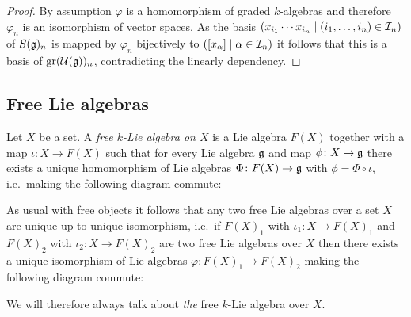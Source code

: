 \begin{proof}
 By assumption $\varphi$ is a homomorphism of graded $k$-algebras and therefore $\varphi_n$ is an isomorphism of vector spaces. As the basis $(x_{i_1} \dotsm x_{i_n} \mid (i_1, \dotsc, i_n) \in \mathcal{I}_n)$ of $S(\mathfrak{g})_n$ is mapped by $\varphi_n$ bijectively to $([x_\alpha] \mid \alpha \in \mathcal{I}_n)$ it follows that this is a basis of $\operatorname{gr}(\mathcal{U}(\mathfrak{g}))_n$, contradicting the linearly dependency.
\end{proof}





\subsection{Free Lie algebras}


\begin{defi}
 Let $X$ be a set. A \emph{free $k$-Lie algebra on $X$} is a Lie algebra $F(X)$ together with a map $\iota \colon X \to F(X)$ such that for every Lie algebra $\mathfrak{g}$ and map $\phi \colon X \to \mathfrak{g}$ there exists a unique homomorphism of Lie algebras $\Phi \colon F(X) \to \mathfrak{g}$ with $\phi = \Phi \circ \iota$, i.e.\ making the following diagram commute:
 \begin{center}
 \end{center}
\end{defi}


\begin{rem}
 As usual with free objects it follows that any two free Lie algebras over a set $X$ are unique up to unique isomorphism, i.e.\ if $F(X)_1$ with $\iota_1 \colon X \to F(X)_1$ and $F(X)_2$ with $\iota_2 \colon X \to F(X)_2$ are two free Lie algebras over $X$ then there exists a unique isomorphism of Lie algebras $\varphi \colon F(X)_1 \to F(X)_2$ making the following diagram commute:
 \begin{center}
 \end{center}
 We will therefore always talk about \emph{the} free $k$-Lie algebra over $X$.
\end{rem}


